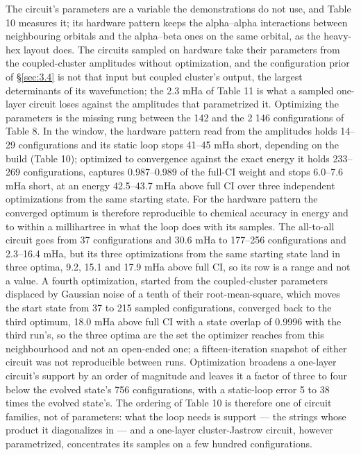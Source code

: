 \documentclass[11pt]{article}
\begin{document}
The circuit's parameters are a variable the demonstrations do not use, and Table 10 measures it; its hardware pattern keeps the alpha--alpha interactions between neighbouring orbitals and the alpha--beta ones on the same orbital, as the heavy-hex layout does. The circuits sampled on hardware take their parameters from the coupled-cluster amplitudes without optimization, and the configuration prior of \S\ref{sec:3.4} is not that input but coupled cluster's output, the largest determinants of its wavefunction; the 2.3 mHa of Table 11 is what a sampled one-layer circuit loses against the amplitudes that parametrized it. Optimizing the parameters is the missing rung between the 142 and the 2 146 configurations of Table 8. In the window, the hardware pattern read from the amplitudes holds 14--29 configurations and its static loop stops 41--45 mHa short, depending on the build (Table 10); optimized to convergence against the exact energy it holds 233--269 configurations, captures 0.987--0.989 of the full-CI weight and stops 6.0--7.6 mHa short, at an energy 42.5--43.7 mHa above full CI over three independent optimizations from the same starting state. For the hardware pattern the converged optimum is therefore reproducible to chemical accuracy in energy and to within a millihartree in what the loop does with its samples. The all-to-all circuit goes from 37 configurations and 30.6 mHa to 177--256 configurations and 2.3--16.4 mHa, but its three optimizations from the same starting state land in three optima, 9.2, 15.1 and 17.9 mHa above full CI, so its row is a range and not a value. A fourth optimization, started from the coupled-cluster parameters displaced by Gaussian noise of a tenth of their root-mean-square, which moves the start state from 37 to 215 sampled configurations, converged back to the third optimum, 18.0 mHa above full CI with a state overlap of 0.9996 with the third run's, so the three optima are the set the optimizer reaches from this neighbourhood and not an open-ended one; a fifteen-iteration snapshot of either circuit was not reproducible between runs. Optimization broadens a one-layer circuit's support by an order of magnitude and leaves it a factor of three to four below the evolved state's 756 configurations, with a static-loop error 5 to 38 times the evolved state's. The ordering of Table 10 is therefore one of circuit families, not of parameters: what the loop needs is support --- the strings whose product it diagonalizes in --- and a one-layer cluster-Jastrow circuit, however parametrized, concentrates its samples on a few hundred configurations.
\end{document}
